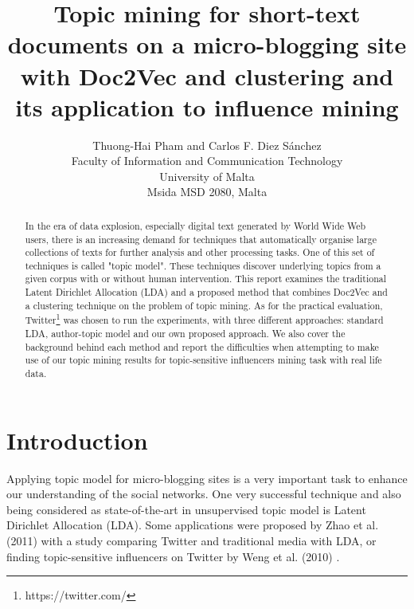 \documentclass[11pt]{article}
\begin{document}
\title{Topic mining for short-text documents on a micro-blogging site with Doc2Vec and clustering and its application to influence mining}


\author{Thuong-Hai Pham and Carlos F. Diez Sánchez\\
Faculty of Information and Communication Technology\\
University of Malta\\
Msida MSD 2080, Malta}

\maketitle

\begin{abstract}
In the era of data explosion, especially digital text generated by World Wide Web users, there is an increasing demand for techniques that automatically organise large collections of texts for further analysis and other processing tasks. One of this set of techniques is called "topic model". These techniques discover underlying topics from a given corpus with or without human intervention. This report examines the traditional Latent Dirichlet Allocation (LDA) and a proposed method that combines Doc2Vec and a clustering technique on the problem of topic mining. As for the practical evaluation, Twitter\footnote{https://twitter.com/} was chosen to run the experiments, with three different approaches: standard LDA, author-topic model and our own proposed approach. We also cover the background behind each method and report the difficulties when attempting to make use of our topic mining results for topic-sensitive influencers mining task with real life data.

\end{abstract}


\section{Introduction}

Applying topic model for micro-blogging sites is a very important task to enhance our understanding of the social networks. One very successful technique and also being considered as state-of-the-art in unsupervised topic model is Latent Dirichlet Allocation (LDA)\cite{Blei2003}. Some applications were proposed by Zhao et al. (2011) \cite{zhao2011comparing} with a study comparing Twitter and traditional media with LDA, or finding topic-sensitive influencers on Twitter by Weng et al. (2010) \cite{Weng2010}.
\end{document}
